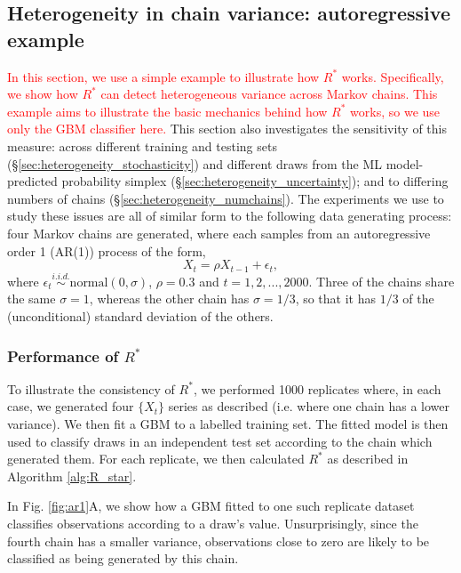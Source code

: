 \documentclass{article}
\begin{document}
\subsection{Heterogeneity in chain variance: autoregressive example}\label{sec:heterogeneity}
\textcolor{red}{In this section, we use a simple example to illustrate how $R^*$ works. Specifically, we show how $R^*$ can detect heterogeneous variance across Markov chains. This example aims to illustrate the basic mechanics behind how $R^*$ works, so we use only the GBM classifier here.} This section also investigates the sensitivity of this measure: across different training and testing sets (\S\ref{sec:heterogeneity_stochasticity}) and different draws from the ML model-predicted probability simplex (\S\ref{sec:heterogeneity_uncertainty}); and to differing numbers of chains (\S\ref{sec:heterogeneity_numchains}). The experiments we use to study these issues are all of similar form to the following data generating process: four Markov chains are generated, where each samples from an autoregressive order 1 (AR(1)) process of the form,
%
\begin{equation}\label{eq:ar1}
X_t = \rho X_{t-1} + \epsilon_t,
\end{equation}
%
where $\epsilon_t\stackrel{i.i.d.}{\sim}\text{normal}(0, \sigma)$, $\rho=0.3$ and $t=1,2,...,2000$. Three of the chains share the same $\sigma=1$, whereas the other chain has $\sigma=1/3$, so that it has $1/3$ of the (unconditional) standard deviation of the others.

\subsubsection{Performance of $R^*$}\label{sec:heterogeneity_performance}
To illustrate the consistency of $R^*$, we performed 1000 replicates where, in each case, we generated four $\{X_t\}$ series as described (i.e. where one chain has a lower variance). We then fit a GBM to a labelled training set. The fitted model is then used to classify draws in an independent test set according to the chain which generated them. For each replicate, we then calculated $R^*$ as described in Algorithm \ref{alg:R_star}.

In Fig. \ref{fig:ar1}A, we show how a GBM fitted to one such replicate dataset classifies observations according to a draw's value. Unsurprisingly, since the fourth chain has a smaller variance, observations close to zero are likely to be classified as being generated by this chain.
\end{document}
